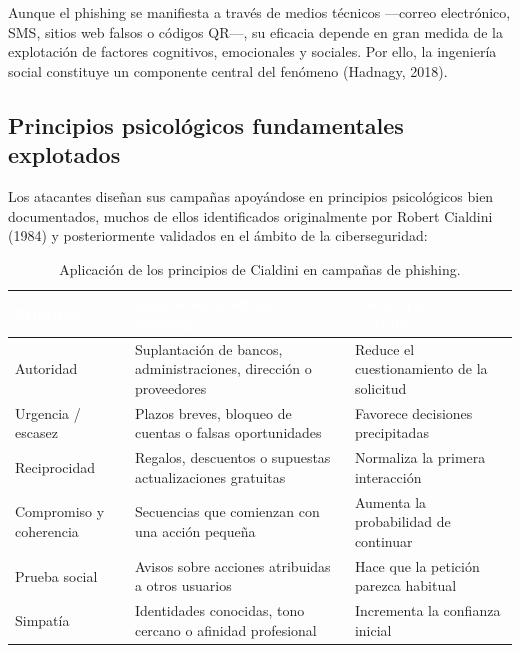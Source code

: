 \documentclass[11pt,a4paper,oneside]{report}
\begin{document}
Aunque el phishing se manifiesta a través de medios técnicos ---correo electrónico, SMS, sitios web falsos o códigos QR---, su eficacia depende en gran medida de la explotación de factores cognitivos, emocionales y sociales. Por ello, la ingeniería social constituye un componente central del fenómeno (Hadnagy, 2018).

\subsection{Principios psicológicos fundamentales explotados}

Los atacantes diseñan sus campañas apoyándose en principios psicológicos bien documentados, muchos de ellos identificados originalmente por Robert Cialdini (1984) y posteriormente validados en el ámbito de la ciberseguridad:

\begingroup
\begin{table}[H]
  \centering
  \small
  \caption{Aplicación de los principios de Cialdini en campañas de phishing.}
  \label{tab:2-4}
  \begin{tabularx}{\textwidth}{|X|X|X|}
    \hline
    \rowcolor{uemcgreen}
    \textcolor{white}{\textbf{Principio}} & \textcolor{white}{\textbf{Aplicación habitual en phishing}} & \textcolor{white}{\textbf{Riesgo para la víctima}} \\
    \hline
    Autoridad & Suplantación de bancos, administraciones, dirección o proveedores & Reduce el cuestionamiento de la solicitud \\
    \hline
    \rowcolor{tablelight}
    Urgencia / escasez & Plazos breves, bloqueo de cuentas o falsas oportunidades & Favorece decisiones precipitadas \\
    \hline
    Reciprocidad & Regalos, descuentos o supuestas actualizaciones gratuitas & Normaliza la primera interacción \\
    \hline
    \rowcolor{tablelight}
    Compromiso y coherencia & Secuencias que comienzan con una acción pequeña & Aumenta la probabilidad de continuar \\
    \hline
    Prueba social & Avisos sobre acciones atribuidas a otros usuarios & Hace que la petición parezca habitual \\
    \hline
    \rowcolor{tablelight}
    Simpatía & Identidades conocidas, tono cercano o afinidad profesional & Incrementa la confianza inicial \\
    \hline
  \end{tabularx}
\end{table}
\endgroup
\end{document}
